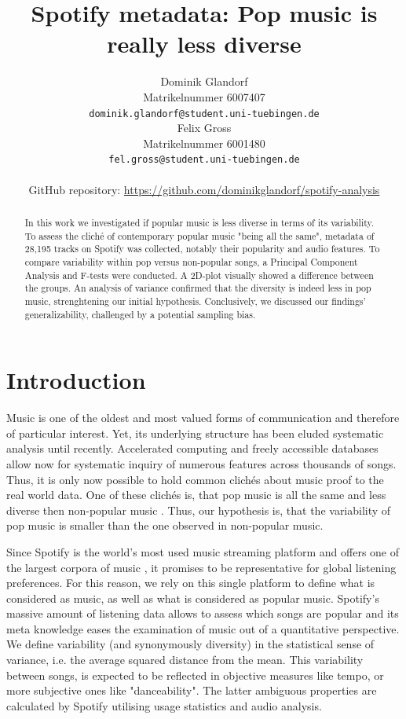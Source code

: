 \documentclass{article}
\title{Spotify metadata: Pop music is really less diverse}
\author{%
  Dominik Glandorf\\
  Matrikelnummer 6007407\\
  \texttt{dominik.glandorf@student.uni-tuebingen.de} \\
  \And
  Felix Gross\\
  Matrikelnummer 6001480\\
  \texttt{fel.gross@student.uni-tuebingen.de} \\
  \\
  GitHub repository: \url{https://github.com/dominikglandorf/spotify-analysis}
}
\begin{document}
\vspace*{-5mm}
\maketitle
\vspace*{-5mm}

\begin{abstract}
In this work we investigated if popular music is less diverse in terms of its variability.
To assess the cliché of contemporary popular music "being all the same",
metadata of 28,195 tracks on Spotify was collected, notably their popularity and audio features. To compare variability within pop versus non-popular songs, a Principal Component Analysis and F-tests were conducted.
A 2D-plot visually showed a difference between the groups. An analysis of variance confirmed that the diversity is indeed less in pop music, strenghtening our initial hypothesis.
Conclusively, we discussed our findings' generalizability, challenged by a potential sampling bias. 
\end{abstract}

\section{Introduction}
Music is one of the oldest and most valued forms of communication and therefore of particular interest. Yet, its underlying structure has been eluded systematic analysis until recently.
Accelerated computing and freely accessible databases allow now for systematic inquiry of numerous features across thousands of songs. Thus, it is only now possible to hold common clichés about music proof to the real world data.
One of these clichés is, that pop music is all the same and less diverse then non-popular music \citep{serra2012measuring}. Thus, our hypothesis is, that the variability of pop music is smaller than the one observed in non-popular music.

Since Spotify is the world's most used music streaming platform and offers one of the largest corpora of music \citep{quarterlyReport}, it promises to be representative for global listening preferences. For this reason, we rely on this single platform to define what is considered as music, as well as what is considered as popular music. Spotify's massive amount of listening data allows to assess which songs are popular and its meta knowledge eases the examination of music out of a quantitative perspective.
We define variability (and synonymously diversity) in the statistical sense of variance, i.e. the average squared distance from the mean. This variability between songs, is expected to be reflected in objective measures like tempo, or more subjective ones like "danceability".  The latter ambiguous properties are calculated by Spotify utilising usage statistics and audio analysis.
\end{document}
